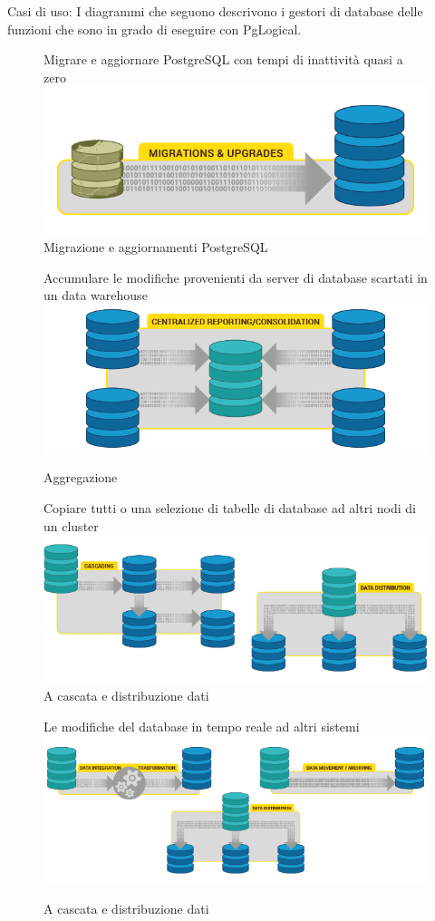 Casi di uso:
I diagrammi che seguono descrivono i gestori di database delle funzioni che sono in grado di eseguire con PgLogical.
\begin{figure}[htbp]
\centering
Migrare e aggiornare PostgreSQL con tempi di inattivit\`a quasi a zero
\includegraphics[scale=0.70]{img/pglogical_1.png}\\
\caption{Migrazione e aggiornamenti PostgreSQL \label{figura1} \cite{etichetta1}}
Accumulare le modifiche provenienti da server di database scartati in un data warehouse
\includegraphics[scale=0.70]{img/pglogical_2.png}\\
\caption{Aggregazione \label{figura2} 
\cite{etichetta2}}
\end{figure}
\begin{figure}[htbp]
\centering
Copiare tutti o una selezione di tabelle di database ad altri nodi di un cluster
\includegraphics[scale=0.70]{img/pglogical_3.png}\\
\caption{A cascata e distribuzione dati \label{figura3} \cite{etichetta2}}
Le modifiche del database in tempo reale ad altri sistemi
\includegraphics[scale=0.70]{img/pglogical_4.png}\\
\caption{A cascata e distribuzione dati \label{figura4} \cite{etichetta2}}
\end{figure}
